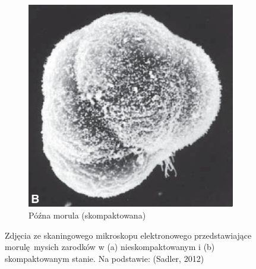 \documentclass[two column, twoside, a4paper]{article}
\begin{document}
\begin{figure}[tp]
\begin{tcolorbox}
\begin{subfigure}[b]{0.4755\textwidth}
			 \includegraphics[width=\textwidth]{./figures/blastomeres2.png}
			 \caption{Późna morula (skompaktowana)}\label{fig::blastomeres:b}
		\end{subfigure}
		 \caption{Zdjęcia ze skaningowego mikroskopu elektronowego przedstawiające morulę mysich zarodków w (a) nieskompaktowanym i (b) skompaktowanym stanie. Na podstawie: (Sadler, 2012)}\label{fig::blastomeres}
	\end{tcolorbox}
\end{figure}
\end{document}

